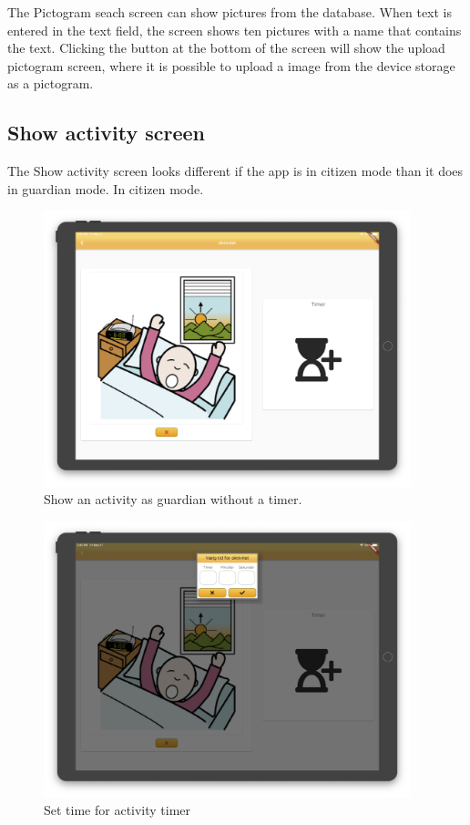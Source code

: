 The Pictogram seach screen can show pictures from the database. When text is entered in the text field, the screen shows ten pictures with a name that contains the text. Clicking the button at the bottom of the screen will show the upload pictogram screen, where it is possible to upload a image from the device storage as a pictogram.

\subsection{Show activity screen}
The Show activity screen looks different if the app is in citizen mode than it does in guardian mode.
In citizen mode.

\begin{figure}[H]
    \begin{center}
        \includegraphics[width=0.95\textwidth]{figures/FinalScreen/showActivityGuardian.png}
    \end{center}
    \caption{Show an activity as guardian without a timer.}
    \label{fig:finalShowActivityGuardianWithoutTimer}
\end{figure}
\begin{figure}[H]
    \begin{center}
        \includegraphics[width=0.95\textwidth]{figures/FinalScreen/showActivityGuardianSetTimer.png}
    \end{center}
    \caption{Set time for activity timer}
    \label{fig:finalShowActivityGuardianSetTimer}
\end{figure}
